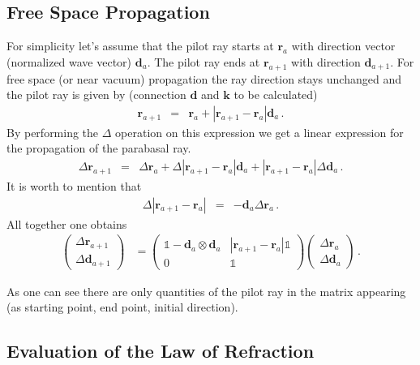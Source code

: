 \documentclass[12pt,a4paper,twoside,openright,BCOR10mm,headsepline,titlepage,abstracton,chapterprefix,final]{scrreprt}
\newcommand\Vector[1]{{\mathbf{#1}}}
\newcommand\wavenumber{k}
\newcommand\Wavevector{\Vector{\wavenumber}}
\begin{document}
\subsection{Free Space Propagation}
For simplicity let's assume that the pilot ray starts at $\Vector{r}_a$ with direction vector (normalized wave vector) $\Vector{d}_a$.
The pilot ray ends at $\Vector{r}_{a+1}$ with direction $\Vector{d}_{a+1}$. For free space (or near vacuum) propagation the ray direction
stays unchanged and the pilot ray is given by (connection $\Vector{d}$ and $\Wavevector$ to be calculated)
\begin{eqnarray}
 \Vector{r}_{a+1} &=& \Vector{r}_a + |\Vector{r}_{a+1} - \Vector{r}_{a}| \Vector{d}_a\,.
\end{eqnarray}
By performing the $\Delta$ operation on this expression we get a linear expression for the propagation of the parabasal ray.
\begin{eqnarray}
 \Delta \Vector{r}_{a+1} &=& \Delta \Vector{r}_a + \Delta |\Vector{r}_{a+1} - \Vector{r}_{a}| \Vector{d}_a + |\Vector{r}_{a+1} - \Vector{r}_{a}| \Delta \Vector{d}_a\,.
\end{eqnarray}
It is worth to mention that
\begin{eqnarray}
 \Delta |\Vector{r}_{a+1} - \Vector{r}_{a}| &=& - \Vector{d}_a \Delta \Vector{r}_a\,.
\end{eqnarray}
All together one obtains 
\begin{eqnarray}
 \begin{pmatrix}
  \Delta \Vector{r}_{a+1} \\
  \Delta \Vector{d}_{a+1}
 \end{pmatrix}
  &=
 \begin{pmatrix}
    \mathds{1} - \Vector{d}_a \otimes \Vector{d}_a & |\Vector{r}_{a+1} - \Vector{r}_{a}|\mathds{1} \\
    0 & \mathds{1}				
 \end{pmatrix}
 \begin{pmatrix}
  \Delta \Vector{r}_{a} \\
  \Delta \Vector{d}_{a}
 \end{pmatrix}\,.
\end{eqnarray}

As one can see there are only quantities of the pilot ray in the matrix appearing (as starting point, end point, initial direction).


\subsection{Evaluation of the Law of Refraction}
\end{document}
